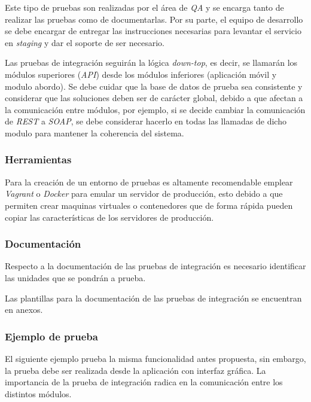 Este tipo de pruebas son realizadas por el área de \textit{QA} y se encarga tanto de realizar las pruebas como de documentarlas. Por su parte, el equipo de desarrollo se debe encargar de entregar las instrucciones necesarias para levantar el servicio en \textit{staging} y dar el soporte de ser necesario.

Las pruebas de integración seguirán la lógica \textit{down-top}, es decir, se llamarán los módulos superiores (\textit{API}) desde los módulos inferiores (aplicación móvil y modulo abordo). Se debe cuidar que la base de datos de prueba sea consistente y considerar que las soluciones deben ser de carácter global, debido a que afectan a la comunicación entre módulos, por ejemplo, si se decide cambiar la comunicación de \textit{REST} a \textit{SOAP}, se debe considerar hacerlo en todas las llamadas de dicho modulo para mantener la coherencia del sistema.


\subsubsection{Herramientas}

Para la creación de un entorno de pruebas es altamente recomendable emplear \textit{Vagrant} o \textit{Docker} para emular un servidor de producción, esto debido a que permiten crear maquinas virtuales o contenedores que de forma rápida pueden copiar las características de los servidores de producción.

\subsubsection{Documentación}

Respecto a la documentación de las pruebas de integración es necesario identificar las unidades que se pondrán a prueba.

Las plantillas para la documentación de las pruebas de integración se encuentran en anexos.

\subsubsection{Ejemplo de prueba}

El siguiente ejemplo prueba la misma funcionalidad antes propuesta, sin embargo, la prueba debe ser realizada desde la aplicación con interfaz gráfica. La importancia de la prueba de integración radica en la comunicación entre los distintos módulos.

